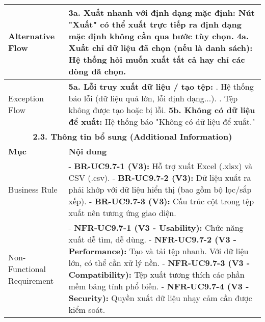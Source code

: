 \begin{longtable}{|m{4cm}|p{11cm}|}
\hline
Alternative Flow & \textbf{3a. Xuất nhanh với định dạng mặc định:} Nút "Xuất" có thể xuất trực tiếp ra định dạng mặc định không cần qua bước tùy chọn. \newline \textbf{4a. Xuất chỉ dữ liệu đã chọn (nếu là danh sách):} Hệ thống hỏi muốn xuất tất cả hay chỉ các dòng đã chọn. \\
\hline
Exception Flow & \textbf{5a. Lỗi truy xuất dữ liệu / tạo tệp:} \newline    1. Hệ thống báo lỗi (dữ liệu quá lớn, lỗi định dạng...). \newline    2. Tệp không được tạo hoặc bị lỗi. \newline \textbf{5b. Không có dữ liệu để xuất:} Hệ thống báo "Không có dữ liệu để xuất." \\
\hline
\multicolumn{2}{|c|}{\textbf{2.3. Thông tin bổ sung (Additional Information)}} \\
\hline
\textbf{Mục} & \textbf{Nội dung} \\
\hline
Business Rule & - \textbf{BR-UC9.7-1 (V3):} Hỗ trợ xuất Excel (.xlsx) và CSV (.csv). \newline - \textbf{BR-UC9.7-2 (V3):} Dữ liệu xuất ra phải khớp với dữ liệu hiển thị (bao gồm bộ lọc/sắp xếp). \newline - \textbf{BR-UC9.7-3 (V3):} Cấu trúc cột trong tệp xuất nên tương ứng giao diện. \\
\hline
Non-Functional Requirement & - \textbf{NFR-UC9.7-1 (V3 - Usability):} Chức năng xuất dễ tìm, dễ dùng. \newline - \textbf{NFR-UC9.7-2 (V3 - Performance):} Tạo và tải tệp nhanh. Với dữ liệu lớn, có thể cần xử lý nền. \newline - \textbf{NFR-UC9.7-3 (V3 - Compatibility):} Tệp xuất tương thích các phần mềm bảng tính phổ biến. \newline - \textbf{NFR-UC9.7-4 (V3 - Security):} Quyền xuất dữ liệu nhạy cảm cần được kiểm soát. \\
\hline
\end{longtable}


